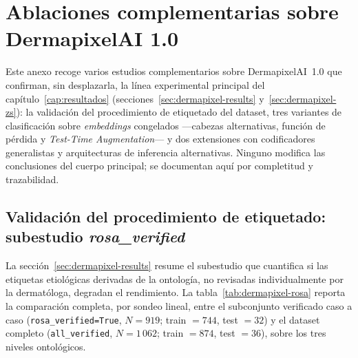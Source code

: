 \chapter{Ablaciones complementarias sobre DermapixelAI 1.0}
\label{cap:anexoj}

Este anexo recoge varios estudios complementarios sobre
DermapixelAI~1.0 que confirman, sin desplazarla, la línea
experimental principal del capítulo~\ref{cap:resultados}
(secciones~\ref{sec:dermapixel-results} y~\ref{sec:dermapixel-zs}):
la validación del procedimiento de etiquetado del dataset, tres
variantes de clasificación sobre \emph{embeddings} congelados
---cabezas alternativas, función de pérdida y \emph{Test-Time
Augmentation}--- y dos extensiones con codificadores generalistas y
arquitecturas de inferencia alternativas. Ninguno modifica las
conclusiones del cuerpo principal; se documentan aquí por
completitud y trazabilidad.


\section{Validación del procedimiento de etiquetado: subestudio
\emph{rosa\_verified}}
\label{sec:anexoj-rosa}

La sección~\ref{sec:dermapixel-results} resume el subestudio que
cuantifica si las etiquetas etiológicas derivadas de la ontología,
no revisadas individualmente por la dermatóloga, degradan el
rendimiento. La tabla~\ref{tab:dermapixel-rosa} reporta la
comparación completa, por sondeo lineal, entre el subconjunto
verificado caso a caso (\texttt{rosa\_verified=True}, $N = 919$;
train $= 744$, test $= 32$) y el dataset completo
(\texttt{all\_verified}, $N = 1\,062$; train $= 874$, test $= 36$),
sobre los tres niveles ontológicos.

